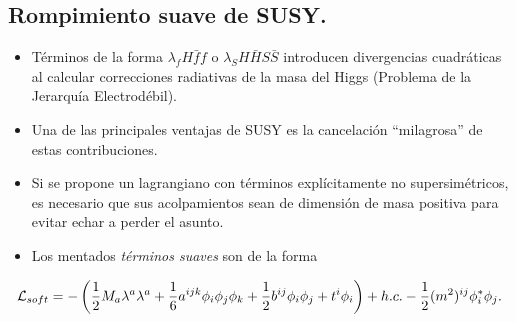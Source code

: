 \documentclass[10pt,a4paper]{beamer}
\begin{document}
\subsection{Rompimiento suave de SUSY.}
\begin{frame}{\subsecname}
\begin{itemize}
  \item Términos de la forma $\lambda_f H\bar f f$ o $\lambda_S H \bar H S \bar S$
    introducen divergencias cuadráticas al calcular correcciones radiativas de
    la masa del Higgs (Problema de la Jerarquía Electrodébil).
  \item Una de las principales ventajas de SUSY es la cancelación ``milagrosa''
    de estas contribuciones.
  \item Si se propone un lagrangiano con términos explícitamente no
    supersimétricos, es necesario que sus acolpamientos sean de dimensión de masa positiva
    para evitar echar a perder el asunto.
  \item Los mentados \emph{términos suaves} son de la forma
\end{itemize}
\[
  \mathcal{L}_{soft} =
  -\left( \frac{1}{2} M_a \lambda^a\lambda^a +
    \frac{1}{6}a^{ijk}\phi_i\phi_j\phi_k
    + \frac{1}{2}b^{ij}\phi_i\phi_j
    + t^{i}\phi_i
  \right) + h.c.
  - \frac{1}{2}(m^2)^{ij}\phi_i^*\phi_j.
\]

\end{frame}
\end{document}
